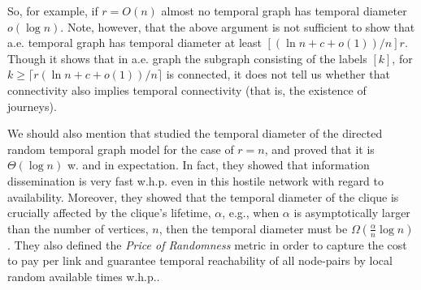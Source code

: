 \documentclass[oribibl, 11pt]{llncs}
\begin{document}
So, for example, if $r=O(n)$ almost no temporal graph has temporal diameter $o(\log n)$. Note, however, that the above argument is not sufficient to show that a.e. temporal graph has temporal diameter at least $[(\ln n +c+o(1))/n]r$. Though it shows that in a.e. graph the subgraph consisting of the labels $[k]$, for $k\geq\lceil r(\ln n +c+o(1))/n\rceil$ is connected, it does not tell us whether that connectivity also implies temporal connectivity (that is, the existence of journeys).

We should also mention that \cite{AGMS14} studied the temporal diameter of the directed random temporal graph model for the case of $r=n$, and proved that it is $\Theta(\log n)$ w. and in expectation. In fact, they showed that information dissemination is very fast w.h.p. even in this hostile network with regard to availability. Moreover, they showed that the temporal diameter of the clique is crucially affected by the clique's lifetime, $\alpha$, e.g., when $\alpha$ is asymptotically larger than the number of vertices, $n$, then the temporal diameter must be $\Omega(\frac{\alpha}{n}\log n)$. They also defined the \emph{Price of Randomness} metric in order to capture the cost to pay per link and guarantee temporal reachability of all node-pairs by local random available times w.h.p..
\end{document}
